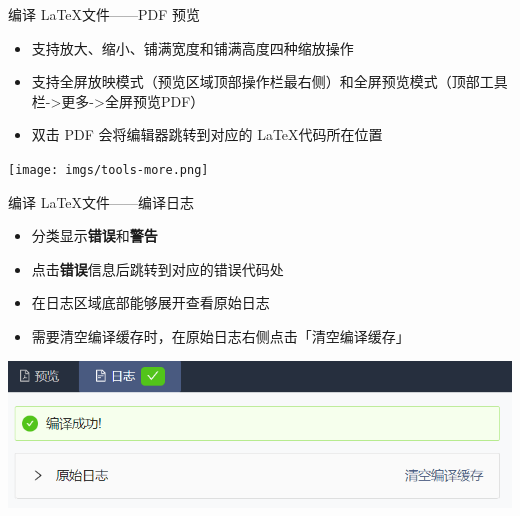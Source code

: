 \documentclass{beamer}
\newenvironment{display}{\trivlist\item[]}{\endtrivlist}
\begin{document}
\begin{frame}{编译 \LaTeX 文件\hfill ——PDF 预览}
\begin{itemize}
\item 支持放大、缩小、铺满宽度和铺满高度四种缩放操作
\item 支持全屏放映模式（预览区域顶部操作栏最右侧）和全屏预览模式（顶部工具栏->更多->全屏预览PDF）
\item 双击 PDF 会将编辑器跳转到对应的 \LaTeX 代码所在位置
\end{itemize}

\begin{display}
\texttt{[image: imgs/tools-more.png]}
\end{display}

\end{frame}



\begin{frame}{编译 \LaTeX 文件\hfill ——编译日志}
\begin{itemize}
\item 分类显示\textbf{\color{red}错误}和\textbf{\color{orange}警告}
\item 点击\textbf{\color{red}错误}信息后跳转到对应的错误代码处
\item 在日志区域底部能够展开查看原始日志
\item 需要清空编译缓存时，在原始日志右侧点击「清空编译缓存」
\end{itemize}

\begin{display}
\includegraphics[width=\textwidth]{imgs/compile-log.png}
\end{display}

\end{frame}
\end{document}
